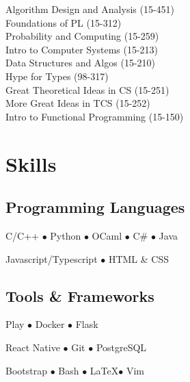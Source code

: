 \documentclass[]{openfont}
\begin{document}
\begin{minipage}[t]{0.39\textwidth}
Algorithm Design and Analysis (15-451) \\
Foundations of PL (15-312) \\
Probability and Computing (15-259) \\

Intro to Computer Systems (15-213) \\
Data Structures and Algos (15-210) \\
Hype for Types (98-317) \\

Great Theoretical Ideas in CS (15-251) \\
More Great Ideas in TCS (15-252) \\
Intro to Functional Programming (15-150) \\
\sectionsep


\section{Skills}
\subsection{Programming Languages}
\vspace{\topsep}
C/C++ \(\bullet\)
Python \(\bullet\)
OCaml \(\bullet\)
C\# \(\bullet\)
Java

Javascript/Typescript \(\bullet\)
HTML \& CSS

\sectionsep

\subsection{Tools \& Frameworks}
\vspace{\topsep}
Play \(\bullet\)
Docker \(\bullet\)
Flask

React Native \(\bullet\)
Git \(\bullet\)
PostgreSQL

Bootstrap \(\bullet\)
Bash \(\bullet\)
\LaTeX \(\bullet\)
Vim
\sectionsep

%
%

\end{minipage} 
\hfill
\end{document}
